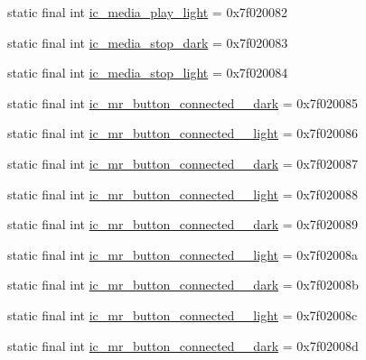 \begin{CompactItemize}
\item 
static final int \hyperlink{classandroid_1_1support_1_1graphics_1_1drawable_1_1_r_1_1drawable_95833d05561cf37108272163afe92a2a}{ic\_\-media\_\-play\_\-light} = 0x7f020082
\item 
static final int \hyperlink{classandroid_1_1support_1_1graphics_1_1drawable_1_1_r_1_1drawable_0ea0a69f1cb17ca4c6d928b3ad4eb243}{ic\_\-media\_\-stop\_\-dark} = 0x7f020083
\item 
static final int \hyperlink{classandroid_1_1support_1_1graphics_1_1drawable_1_1_r_1_1drawable_877a0f346196eed77c0e89bba2cf038a}{ic\_\-media\_\-stop\_\-light} = 0x7f020084
\item 
static final int \hyperlink{classandroid_1_1support_1_1graphics_1_1drawable_1_1_r_1_1drawable_bf80bfa07f2a34efde74eedeeb29b0ca}{ic\_\-mr\_\-button\_\-connected\_\_\-dark} = 0x7f020085
\item 
static final int \hyperlink{classandroid_1_1support_1_1graphics_1_1drawable_1_1_r_1_1drawable_3ea5e57b68be9e9cb7f8673dd6be077e}{ic\_\-mr\_\-button\_\-connected\_\_\-light} = 0x7f020086
\item 
static final int \hyperlink{classandroid_1_1support_1_1graphics_1_1drawable_1_1_r_1_1drawable_f70072e527022247f790bf78a159cd31}{ic\_\-mr\_\-button\_\-connected\_\_\-dark} = 0x7f020087
\item 
static final int \hyperlink{classandroid_1_1support_1_1graphics_1_1drawable_1_1_r_1_1drawable_0cd736fca276b92966403f4082229e10}{ic\_\-mr\_\-button\_\-connected\_\_\-light} = 0x7f020088
\item 
static final int \hyperlink{classandroid_1_1support_1_1graphics_1_1drawable_1_1_r_1_1drawable_f41af8dc06656ab4bdef45d79606626d}{ic\_\-mr\_\-button\_\-connected\_\_\-dark} = 0x7f020089
\item 
static final int \hyperlink{classandroid_1_1support_1_1graphics_1_1drawable_1_1_r_1_1drawable_1103e7bf39c1b1e88e84cee13f0f3854}{ic\_\-mr\_\-button\_\-connected\_\_\-light} = 0x7f02008a
\item 
static final int \hyperlink{classandroid_1_1support_1_1graphics_1_1drawable_1_1_r_1_1drawable_09e0251116ffc3bc1eaab0c288efcc93}{ic\_\-mr\_\-button\_\-connected\_\_\-dark} = 0x7f02008b
\item 
static final int \hyperlink{classandroid_1_1support_1_1graphics_1_1drawable_1_1_r_1_1drawable_89a29e5d601564aaa59ce9666a3d3e98}{ic\_\-mr\_\-button\_\-connected\_\_\-light} = 0x7f02008c
\item 
static final int \hyperlink{classandroid_1_1support_1_1graphics_1_1drawable_1_1_r_1_1drawable_46d091b82c755251dfcb83c6085c8ad1}{ic\_\-mr\_\-button\_\-connected\_\_\-dark} = 0x7f02008d

\end{CompactItemize}
